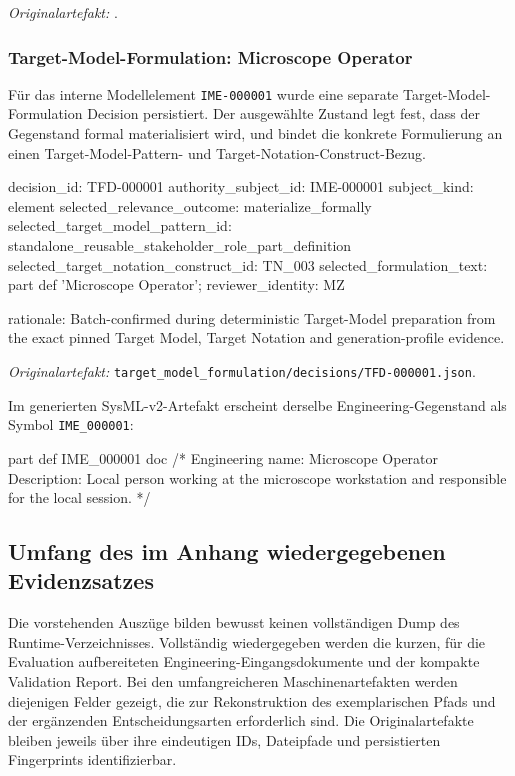 \noindent\textit{Originalartefakt:}
.

\subsubsection{Target-Model-Formulation: Microscope Operator}

Für das interne Modellelement \texttt{IME-000001} wurde eine separate
Target-Model-Formulation Decision persistiert. Der ausgewählte Zustand legt
fest, dass der Gegenstand formal materialisiert wird, und bindet die konkrete
Formulierung an einen Target-Model-Pattern- und Target-Notation-Construct-Bezug.

\begin{evidencebox}
decision_id:                       TFD-000001
authority_subject_id:              IME-000001
subject_kind:                      element
selected_relevance_outcome:        materialize_formally
selected_target_model_pattern_id:  standalone_reusable_stakeholder_role_part_definition
selected_target_notation_construct_id: TN_003
selected_formulation_text:         part def 'Microscope Operator';
reviewer_identity:                 MZ

rationale:
  Batch-confirmed during deterministic Target-Model preparation from the exact
  pinned Target Model, Target Notation and generation-profile evidence.
\end{evidencebox}

\noindent\textit{Originalartefakt:}
\texttt{target\_model\_formulation/decisions/TFD-000001.json}.

Im generierten SysML-v2-Artefakt erscheint derselbe Engineering-Gegenstand als
Symbol \texttt{IME\_000001}:

\begin{evidencebox}
part def IME_000001 {
    doc /* Engineering name: Microscope Operator
    Description:
    Local person working at the microscope workstation and responsible for the local session. */
}
\end{evidencebox}

\subsection{Umfang des im Anhang wiedergegebenen Evidenzsatzes}
\label{app:traceability_930444_scope}

Die vorstehenden Auszüge bilden bewusst keinen vollständigen Dump des
Runtime-Verzeichnisses. Vollständig wiedergegeben werden die kurzen, für die Evaluation
aufbereiteten Engineering-Eingangsdokumente und der kompakte Validation Report. Bei den
umfangreicheren Maschinenartefakten werden diejenigen Felder gezeigt, die zur
Rekonstruktion des exemplarischen Pfads und der ergänzenden Entscheidungsarten
erforderlich sind. Die Originalartefakte bleiben jeweils über ihre eindeutigen
IDs, Dateipfade und persistierten Fingerprints identifizierbar.

